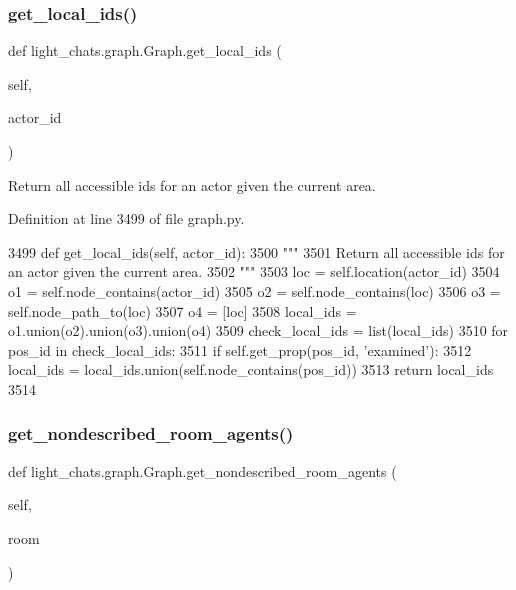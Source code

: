 \subsubsection{\texorpdfstring{get\+\_\+local\+\_\+ids()}{get\_local\_ids()}}
{\footnotesize\ttfamily def light\+\_\+chats.\+graph.\+Graph.\+get\+\_\+local\+\_\+ids (\begin{DoxyParamCaption}\item[{}]{self,  }\item[{}]{actor\+\_\+id }\end{DoxyParamCaption})}

\begin{DoxyVerb}Return all accessible ids for an actor given the current area.
\end{DoxyVerb}
 

Definition at line 3499 of file graph.\+py.


\begin{DoxyCode}
3499     \textcolor{keyword}{def }get\_local\_ids(self, actor\_id):
3500         \textcolor{stringliteral}{"""}
3501 \textcolor{stringliteral}{        Return all accessible ids for an actor given the current area.}
3502 \textcolor{stringliteral}{        """}
3503         loc = self.location(actor\_id)
3504         o1 = self.node\_contains(actor\_id)
3505         o2 = self.node\_contains(loc)
3506         o3 = self.node\_path\_to(loc)
3507         o4 = [loc]
3508         local\_ids = o1.union(o2).union(o3).union(o4)
3509         check\_local\_ids = list(local\_ids)
3510         \textcolor{keywordflow}{for} pos\_id \textcolor{keywordflow}{in} check\_local\_ids:
3511             \textcolor{keywordflow}{if} self.get\_prop(pos\_id, \textcolor{stringliteral}{'examined'}):
3512                 local\_ids = local\_ids.union(self.node\_contains(pos\_id))
3513         \textcolor{keywordflow}{return} local\_ids
3514 
\end{DoxyCode}
\mbox{\label{classlight__chats_1_1graph_1_1Graph_ae8a732327aed100ff96fb2349246738c}} 
\subsubsection{\texorpdfstring{get\+\_\+nondescribed\+\_\+room\+\_\+agents()}{get\_nondescribed\_room\_agents()}}
{\footnotesize\ttfamily def light\+\_\+chats.\+graph.\+Graph.\+get\+\_\+nondescribed\+\_\+room\+\_\+agents (\begin{DoxyParamCaption}\item[{}]{self,  }\item[{}]{room }\end{DoxyParamCaption})}

